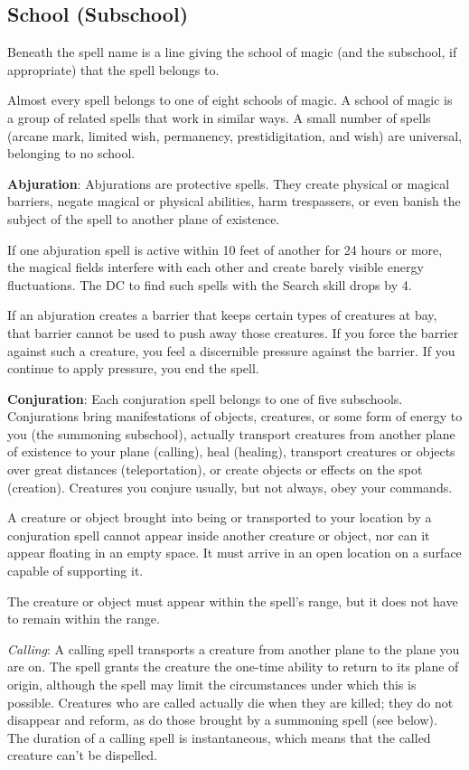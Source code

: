 \subsection{School (Subschool)}
Beneath the spell name is a line giving the school of magic (and the subschool, if appropriate) that the spell belongs to.

Almost every spell belongs to one of eight schools of magic. A school of magic is a group of related spells that work in similar ways. A small number of spells (arcane mark, limited wish, permanency, prestidigitation, and wish) are universal, belonging to no school.

\textbf{Abjuration}: Abjurations are protective spells. They create physical or magical barriers, negate magical or physical abilities, harm trespassers, or even banish the subject of the spell to another plane of existence.

If one abjuration spell is active within 10 feet of another for 24 hours or more, the magical fields interfere with each other and create barely visible energy fluctuations. The DC to find such spells with the Search skill drops by 4.

If an abjuration creates a barrier that keeps certain types of creatures at bay, that barrier cannot be used to push away those creatures. If you force the barrier against such a creature, you feel a discernible pressure against the barrier. If you continue to apply pressure, you end the spell.

\textbf{Conjuration}: Each conjuration spell belongs to one of five subschools. Conjurations bring manifestations of objects, creatures, or some form of energy to you (the summoning subschool), actually transport creatures from another plane of existence to your plane (calling), heal (healing), transport creatures or objects over great distances (teleportation), or create objects or effects on the spot (creation). Creatures you conjure usually, but not always, obey your commands.

A creature or object brought into being or transported to your location by a conjuration spell cannot appear inside another creature or object, nor can it appear floating in an empty space. It must arrive in an open location on a surface capable of supporting it.

The creature or object must appear within the spell's range, but it does not have to remain within the range.

\textit{Calling}: A calling spell transports a creature from another plane to the plane you are on. The spell grants the creature the one-time ability to return to its plane of origin, although the spell may limit the circumstances under which this is possible. Creatures who are called actually die when they are killed; they do not disappear and reform, as do those brought by a summoning spell (see below). The duration of a calling spell is instantaneous, which means that the called creature can't be dispelled.

